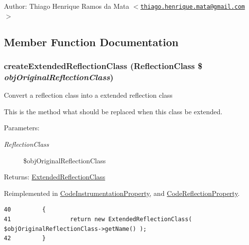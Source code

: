 \begin{Desc}
\item[Author:]Thiago Henrique Ramos da Mata $<$\href{mailto:thiago.henrique.mata@gmail.com}{\tt thiago.henrique.mata@gmail.com}$>$ \end{Desc}


\subsection{Member Function Documentation}
\hypertarget{class_extended_reflection_property_6b56ec198bc6a5b5a72076e4e7c19e29}{
\subsubsection[{createExtendedReflectionClass}]{\setlength{\rightskip}{0pt plus 5cm}createExtendedReflectionClass (ReflectionClass \$ {\em objOriginalReflectionClass})}}
\label{class_extended_reflection_property_6b56ec198bc6a5b5a72076e4e7c19e29}


Convert a reflection class into a extended reflection class

This is the method what should be replaced when this class be extended.

\begin{Desc}
\item[Parameters:]
\begin{description}
\item[{\em ReflectionClass}]\$objOriginalReflectionClass \end{description}
\end{Desc}
\begin{Desc}
\item[Returns:]\hyperlink{class_extended_reflection_class}{ExtendedReflectionClass} \end{Desc}


Reimplemented in \hyperlink{class_code_instrumentation_property_6b56ec198bc6a5b5a72076e4e7c19e29}{CodeInstrumentationProperty}, and \hyperlink{class_code_reflection_property_6b56ec198bc6a5b5a72076e4e7c19e29}{CodeReflectionProperty}.

\begin{Code}\begin{verbatim}40         {
41                 return new ExtendedReflectionClass( $objOriginalReflectionClass->getName() );
42         }
\end{verbatim}
\end{Code}


